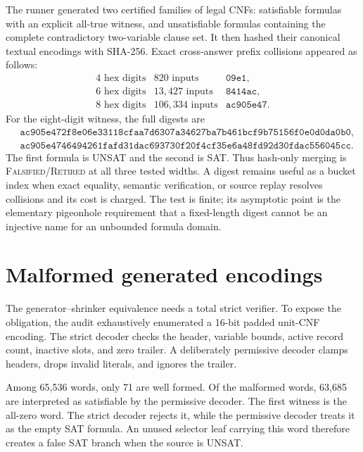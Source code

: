 \documentclass[11pt]{article}
\newcommand{\Retired}{\textsc{Falsified/}\allowbreak\textsc{Retired}}
\begin{document}
The runner generated two certified families of legal CNFs: satisfiable
formulas with an explicit all-true witness, and unsatisfiable formulas
containing the complete contradictory two-variable clause set.  It then
hashed their canonical textual encodings with SHA-256.  Exact cross-answer
prefix collisions appeared as follows:
\[
\begin{array}{ccl}
4\text{ hex digits} & 820\text{ inputs} & \texttt{09e1},\\
6\text{ hex digits} & 13{,}427\text{ inputs} & \texttt{8414ac},\\
8\text{ hex digits} & 106{,}334\text{ inputs} & \texttt{ac905e47}.
\end{array}
\]
For the eight-digit witness, the full digests are
\begin{align*}
&\texttt{ac905e472f8e06e33118cfaa7d6307a34627ba7b461bcf9b75156f0e0d0da0b0},\\
&\texttt{ac905e4746494261fafd31dac693730f20f4cf35e6a48fd92d30fdac556045cc}.
\end{align*}
The first formula is UNSAT and the second is SAT.  Thus hash-only merging is
\Retired{} at all three tested widths.  A digest remains useful as a bucket
index when exact equality, semantic verification, or source replay resolves
collisions and its cost is charged.  The test is finite; its asymptotic point
is the elementary pigeonhole requirement that a fixed-length digest cannot be
an injective name for an unbounded formula domain.

\section{Malformed generated encodings}

The generator--shrinker equivalence needs a total strict verifier.  To expose the obligation,
the audit exhaustively enumerated a 16-bit padded unit-CNF encoding.  The
strict decoder checks the header, variable bounds, active record count,
inactive slots, and zero trailer.  A deliberately permissive decoder clamps
headers, drops invalid literals, and ignores the trailer.

Among 65,536 words, only 71 are well formed.  Of the malformed words, 63,685
are interpreted as satisfiable by the permissive decoder.  The first witness
is the all-zero word.  The strict decoder rejects it, while the permissive
decoder treats it as the empty SAT formula.  An unused selector leaf carrying
this word therefore creates a false SAT branch when the source is UNSAT.
\end{document}
